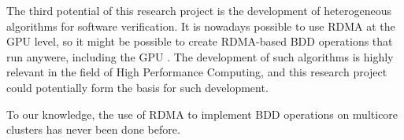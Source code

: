 The third potential of this research project is the development of heterogeneous algorithms for software verification. It is nowadays possible to use RDMA at the GPU level, so it might be possible to create RDMA-based BDD operations that run anywere, including the GPU \cite{gpudirect}. The development of such algorithms is highly relevant in the field of High Performance Computing, and this research project could potentially form the basis for such development.

To our knowledge, the use of RDMA to implement BDD operations on multicore clusters has never been done before.